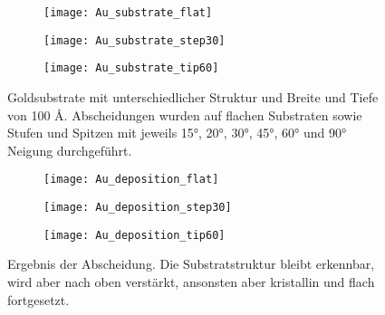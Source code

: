 \begin{figure}[bt]
  \captionsetup[subfigure]{singlelinecheck=false}
  \def\subfigwidth{0.31\textwidth}
  \begin{subfigure}[t]{\subfigwidth}
    \texttt{[image: Au\_substrate\_flat]}
    \label{fig:goldsubstrate-a}
  \end{subfigure}
  \hfill
  \begin{subfigure}[t]{\subfigwidth}
    \texttt{[image: Au\_substrate\_step30]}
    \label{fig:goldsubstrate-a}
  \end{subfigure}
  \hfill
  \begin{subfigure}[t]{\subfigwidth}
    \texttt{[image: Au\_substrate\_tip60]}
    \label{fig:goldsubstrate-a}
  \end{subfigure}
  \caption[Strukturierte Goldsubstrate]{Goldsubstrate mit unterschiedlicher Struktur und Breite und Tiefe von 100 \AA.
    Abscheidungen wurden auf flachen Substraten sowie Stufen und Spitzen mit jeweils 15°, 20°, 30°, 45°, 60° und 90° Neigung durchgeführt.}
  \label{fig:goldsubstrate}
\end{figure}

\begin{figure}[bt]
  \captionsetup[subfigure]{singlelinecheck=false}
  \def\subfigwidth{0.31\textwidth}
  \begin{subfigure}[t]{\subfigwidth}
    \texttt{[image: Au\_deposition\_flat]}
    \label{fig:goldsubstrate-a}
  \end{subfigure}
  \hfill
  \begin{subfigure}[t]{\subfigwidth}
    \texttt{[image: Au\_deposition\_step30]}
    \label{fig:goldsubstrate-a}
  \end{subfigure}
  \hfill
  \begin{subfigure}[t]{\subfigwidth}
    \texttt{[image: Au\_deposition\_tip60]}
    \label{fig:goldsubstrate-a}
  \end{subfigure}
  \caption[Abscheidung auf strukturierten Substraten]{
    Ergebnis der Abscheidung.
    Die Substratstruktur bleibt erkennbar, wird aber nach oben verstärkt, ansonsten aber kristallin und flach fortgesetzt.
  }
  \label{fig:golddepositions}
\end{figure}

